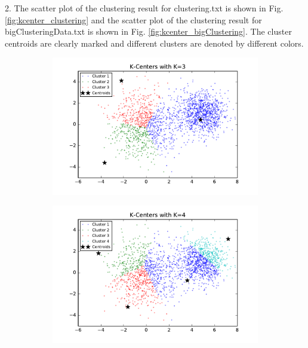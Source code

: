 \begin{description}
\begin{description}
\item{2.} The scatter plot of the clustering result for clustering.txt is shown in Fig. \ref{fig:kcenter_clustering} and the scatter plot of the clustering result for bigClusteringData.txt is shown in Fig. \ref{fig:kcenter_bigClustering}. The cluster centroids are clearly marked and different clusters are denoted by different colors. 

\begin{figure}[!h]
        \centering
        \begin{subfigure}[b]{0.475\textwidth}
            \centering
            \includegraphics[width=\textwidth]{./figures/clustering_kCenter_3.pdf}
        \end{subfigure}
        \hfill
        \begin{subfigure}[b]{0.475\textwidth}  
            \centering 
            \includegraphics[width=\textwidth]{./figures/clustering_kCenter_4.pdf}

\end{subfigure}
\end{figure}
\end{description}
\end{description}
